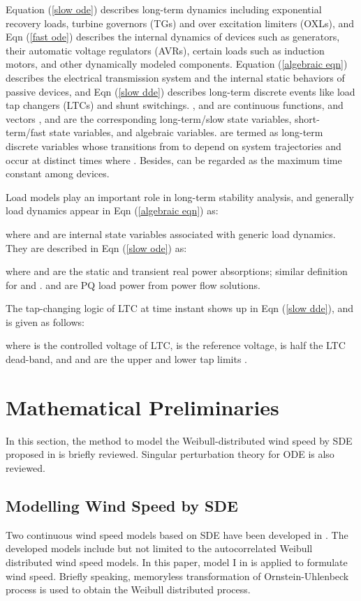 \documentclass[journal]{IEEEtran}
\begin{document}
Equation (\ref{slow ode}) describes long-term dynamics including exponential recovery loads, turbine governors (TGs) and over excitation limiters (OXLs), and Eqn (\ref{fast ode}) describes the internal dynamics of devices such as generators, their automatic voltage regulators (AVRs), certain loads such as induction motors, and other dynamically modeled components. Equation (\ref{algebraic eqn}) describes the electrical transmission system and the internal static behaviors of passive devices, and Eqn (\ref{slow dde}) describes long-term discrete events like load tap changers (LTCs) and shunt switchings. ,  and  are continuous functions, and vectors ,  and  are the corresponding long-term/slow state variables, short-term/fast state variables, and algebraic variables.  are termed as long-term discrete variables whose transitions from  to  depend on system trajectories and occur at distinct times  where . Besides,  can be regarded as the maximum time constant among devices.

Load models play an important role in long-term stability analysis, and generally load dynamics appear in Eqn (\ref{algebraic eqn}) as:

where  and  are internal state variables associated with generic load dynamics. They are described in Eqn (\ref{slow ode}) as:

where  and  are the static and transient real power absorptions; similar definition for  and .  and  are PQ load power from power flow solutions\cite{Kundur:book}\cite{Milano:article}.

The tap-changing logic of LTC at time instant  shows up in Eqn (\ref{slow dde}), and is given as follows:

where  is the controlled voltage of LTC,  is the reference voltage,  is half the LTC dead-band, and  and  are the upper and lower tap limits \cite{Cutsem:book}\cite{Kundur:book}\cite{Milano:article}.

\section{Mathematical Preliminaries}\label{mathprelim}
In this section, the method to model the Weibull-distributed wind speed by SDE proposed in \cite{Milano:2013_1}\cite{Milano:2013} is briefly reviewed. Singular perturbation theory for ODE \cite{Khalil:book} is also reviewed. \subsection{Modelling Wind Speed by SDE}\label{subsection modelling wind by SDE}
Two continuous wind speed models based on SDE have been developed in \cite{Milano:2013_1}\cite{Milano:2013}. The developed models include but not limited to the autocorrelated Weibull distributed wind speed models.
In this paper, model I in \cite{Milano:2013_1} is applied to formulate wind speed. Briefly speaking, memoryless transformation of Ornstein-Uhlenbeck process is used to obtain the Weibull distributed process.
\end{document}
